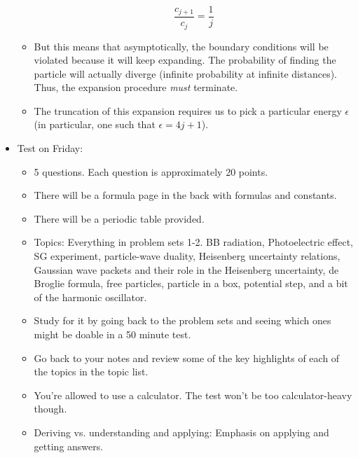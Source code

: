 \documentclass[../notes.tex]{subfiles}
\begin{document}
\begin{itemize}
\begin{itemize}
        \begin{equation*}
            \frac{c_{j+1}}{c_j} = \frac{1}{j}
        \end{equation*}
        \item But this means that asymptotically, the boundary conditions will be violated because it will keep expanding. The probability of finding the particle will actually diverge (infinite probability at infinite distances). Thus, the expansion procedure \emph{must} terminate.
        \item The truncation of this expansion requires us to pick a particular energy $\epsilon$ (in particular, one such that $\epsilon=4j+1$).
    \end{itemize}
    \item Test on Friday:
    \begin{itemize}
        \item 5 questions. Each question is approximately 20 points.
        \item There will be a formula page in the back with formulas and constants.
        \item There will be a periodic table provided.
        \item Topics: Everything in problem sets 1-2. BB radiation, Photoelectric effect, SG experiment, particle-wave duality, Heisenberg uncertainty relations, Gaussian wave packets and their role in the Heisenberg uncertainty, de Broglie formula, free particles, particle in a box, potential step, and a bit of the harmonic oscillator.
        \item Study for it by going back to the problem sets and seeing which ones might be doable in a 50 minute test.
        \item Go back to your notes and review some of the key highlights of each of the topics in the topic list.
        \item You're allowed to use a calculator. The test won't be too calculator-heavy though.
        \item Deriving vs. understanding and applying: Emphasis on applying and getting answers.
    \end{itemize}
\end{itemize}
\end{document}
